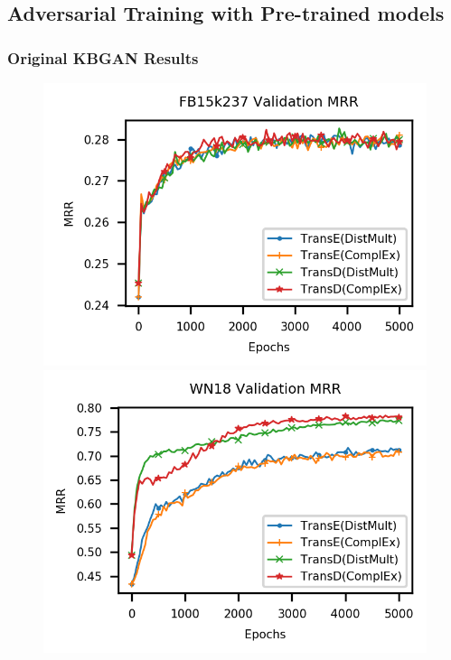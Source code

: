 \subsection{Adversarial Training with Pre-trained models}
\label{app:subsec:adv_training}

\subsubsection{Original KBGAN Results}
\label{sec:appendix:originalkbganresults}


\begin{figure}
    \centering
    \begin{minipage}{.3\textwidth}
      \centering
      \includegraphics[width=0.9\linewidth]{appendices/figures/original_results/FB15k237_MRR.png}
    \end{minipage}%
    \begin{minipage}{.3\textwidth}
      \centering
      \includegraphics[width=\linewidth]{appendices/figures/original_results/WN18_MRR.png}

\end{minipage}
\end{figure}
